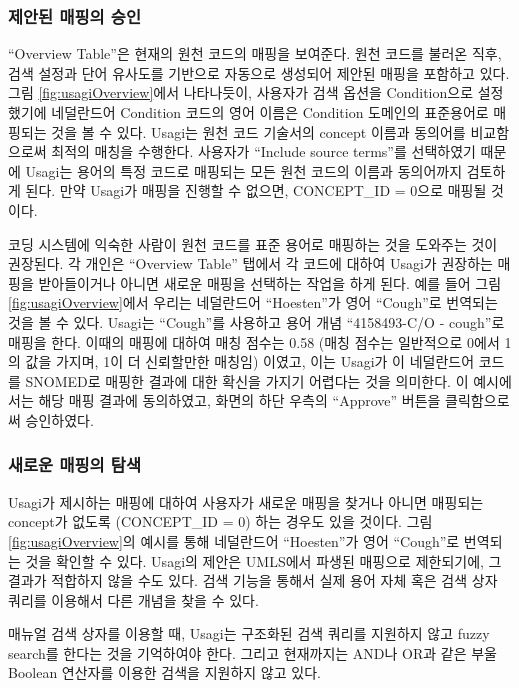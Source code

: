 \documentclass[10.5pt]{book}
\theoremstyle{definition}
\theoremstyle{definition}
\theoremstyle{definition}
\theoremstyle{remark}
\begin{document}
\subsubsection*{제안된 매핑의 승인}\label{--}

``Overview Table''은 현재의 원천 코드의 매핑을 보여준다. 원천 코드를
불러온 직후, 검색 설정과 단어 유사도를 기반으로 자동으로 생성되어 제안된
매핑을 포함하고 있다. 그림 \ref{fig:usagiOverview}에서 나타나듯이,
사용자가 검색 옵션을 Condition으로 설정했기에 네덜란드어 Condition
코드의 영어 이름은 Condition 도메인의 표준용어로 매핑되는 것을 볼 수
있다. Usagi는 원천 코드 기술서의 concept 이름과 동의어를 비교함으로써
최적의 매칭을 수행한다. 사용자가 ``Include source terms''를 선택하였기
때문에 Usagi는 용어의 특정 코드로 매핑되는 모든 원천 코드의 이름과
동의어까지 검토하게 된다. 만약 Usagi가 매핑을 진행할 수 없으면,
CONCEPT\_ID = 0으로 매핑될 것이다.

코딩 시스템에 익숙한 사람이 원천 코드를 표준 용어로 매핑하는 것을
도와주는 것이 권장된다. 각 개인은 ``Overview Table'' 탭에서 각 코드에
대하여 Usagi가 권장하는 매핑을 받아들이거나 아니면 새로운 매핑을
선택하는 작업을 하게 된다. 예를 들어 그림 \ref{fig:usagiOverview}에서
우리는 네덜란드어 ``Hoesten''가 영어 ``Cough''로 번역되는 것을 볼 수
있다. Usagi는 ``Cough''를 사용하고 용어 개념 ``4158493-C/O - cough''로
매핑을 한다. 이때의 매핑에 대하여 매칭 점수는 0.58 (매칭 점수는
일반적으로 0에서 1의 값을 가지며, 1이 더 신뢰할만한 매칭임) 이였고, 이는
Usagi가 이 네덜란드어 코드를 SNOMED로 매핑한 결과에 대한 확신을 가지기
어렵다는 것을 의미한다. 이 예시에서는 해당 매핑 결과에 동의하였고,
화면의 하단 우측의 ``Approve'' 버튼을 클릭함으로써 승인하였다.

\subsubsection*{새로운 매핑의 탐색}\label{--}

Usagi가 제시하는 매핑에 대하여 사용자가 새로운 매핑을 찾거나 아니면
매핑되는 concept가 없도록 (CONCEPT\_ID = 0) 하는 경우도 있을 것이다.
그림 \ref{fig:usagiOverview}의 예시를 통해 네덜란드어 ``Hoesten''가 영어
``Cough''로 번역되는 것을 확인할 수 있다. Usagi의 제안은 UMLS에서 파생된
매핑으로 제한되기에, 그 결과가 적합하지 않을 수도 있다. 검색 기능을
통해서 실제 용어 자체 혹은 검색 상자 쿼리를 이용해서 다른 개념을 찾을 수
있다.

매뉴얼 검색 상자를 이용할 때, Usagi는 구조화된 검색 쿼리를 지원하지 않고
fuzzy search를 한다는 것을 기억하여야 한다. 그리고 현재까지는 AND나 OR과
같은 부울Boolean 연산자를 이용한 검색을 지원하지 않고 있다.
\end{document}
